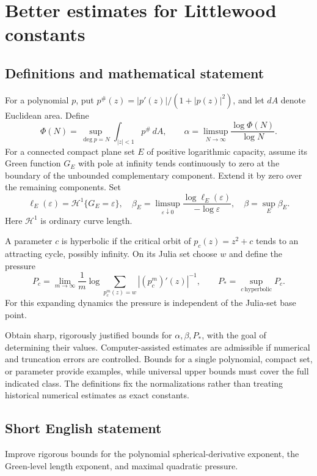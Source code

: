 \documentclass[11pt,a4paper]{article}
\begin{document}
\section*{Better estimates for Littlewood constants}\label{statement}

\subsection{Definitions and mathematical statement}
For a polynomial $p$, put $p^\#(z)=|p'(z)|/(1+|p(z)|^2)$,
and let $dA$ denote Euclidean area. Define
\[
 \Phi(N)=\sup_{\deg p=N}\int_{|z|<1}p^\#\,dA,
 \qquad \alpha=\limsup_{N\to\infty}\frac{\log\Phi(N)}{\log N}.
\]
For a connected compact plane set $E$ of positive
logarithmic capacity, assume its Green function $G_E$
with pole at infinity tends continuously to zero
at the boundary of the unbounded complementary component.
Extend it by zero over the remaining components.
Set
\[
 \ell_E(\varepsilon)=\mathcal H^1\{G_E=\varepsilon\},
 \quad \beta_E=\limsup_{\varepsilon\downarrow0}
             \frac{\log\ell_E(\varepsilon)}{-\log\varepsilon},
 \quad \beta=\sup_E\beta_E .
\]
Here $\mathcal H^1$ is ordinary curve length.

A parameter $c$ is hyperbolic if the critical orbit
of $p_c(z)=z^2+c$ tends to an attracting cycle,
possibly infinity. On its Julia set choose $w$
and define the pressure
\[
 P_c=\lim_{m\to\infty}\frac1m
       \log\sum_{p_c^m(z)=w}|(p_c^m)'(z)|^{-1},
 \qquad P_*=\sup_{c\ \mathrm{hyperbolic}}P_c.
\]
For this expanding dynamics the pressure is independent
of the Julia-set base point.

Obtain sharp, rigorously justified bounds for
$\alpha,\beta,P_*$, with the goal of determining
their values. Computer-assisted estimates are admissible
if numerical and truncation errors are controlled.
Bounds for a single polynomial, compact set, or
parameter provide examples, while universal upper
bounds must cover the full indicated class. The
definitions fix the normalizations rather than treating
historical numerical estimates as exact constants.
\subsection{Short English statement}
Improve rigorous bounds for the polynomial spherical-derivative exponent, the Green-level length exponent, and maximal quadratic pressure.
\end{document}
